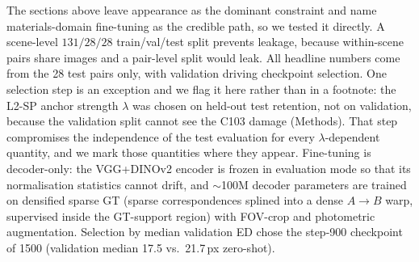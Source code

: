 \documentclass[fleqn,10pt]{wlscirep}
\begin{document}
The sections above leave appearance as the dominant constraint and name materials-domain fine-tuning as the credible path, so we tested it directly. A scene-level $131/28/28$ train/val/test split prevents leakage, because within-scene pairs share images and a pair-level split would leak. All headline numbers come from the 28 test pairs only, with validation driving checkpoint selection. One selection step is an exception and we flag it here rather than in a footnote: the L2-SP anchor strength $\lambda$ was chosen on held-out test retention, not on validation, because the validation split cannot see the C103 damage (Methods). That step compromises the independence of the test evaluation for every $\lambda$-dependent quantity, and we mark those quantities where they appear. Fine-tuning is decoder-only: the VGG+DINOv2 encoder is frozen in evaluation mode so that its normalisation statistics cannot drift, and $\sim$100M decoder parameters are trained on densified sparse GT (sparse correspondences splined into a dense $A\rightarrow B$ warp, supervised inside the GT-support region) with FOV-crop and photometric augmentation. Selection by median validation ED chose the step-900 checkpoint of 1500 (validation median 17.5 vs.\ 21.7\,px zero-shot).
\end{document}
